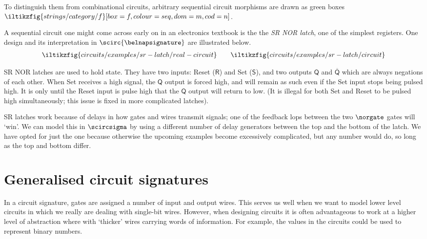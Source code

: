 To distinguish them from combinational circuits, arbitrary sequential circuit
morphisms are drawn as green boxes \(
\iltikzfig{strings/category/f}[box=f,colour=seq,dom=m,cod=n]
\).

\begin{example}[SR latch]\label{ex:sr-latch}
    A sequential circuit one might come across early on in an electronics
    textbook is the the \emph{SR NOR latch}, one of the simplest registers.
    One design and its interpretation in \(\scirc{\belnapsignature}\) are
    illustrated below.
    \begin{gather*}
        \iltikzfig{circuits/examples/sr-latch/real-circuit}
        \qquad
        \iltikzfig{circuits/examples/sr-latch/circuit}
    \end{gather*}

    SR NOR latches are used to hold state.
    They have two inputs: Reset (\(\mathsf{R}\)) and Set (\(\mathsf{S}\)), and
    two outputs \(\mathsf{Q}\) and \(\overline{\mathsf{Q}}\) which are always
    negations of each other.
    When Set receives a high signal, the \(\mathsf{Q}\) output is forced high,
    and will remain as such even if the Set input stops being pulsed high.
    It is only until the Reset input is pulse high that the \(\mathsf{Q}\)
    output will return to low.
    (It is illegal for both Set and Reset to be pulsed high simultaneously; this
    issue is fixed in more complicated latches).

    SR latches work because of delays in how gates and wires transmit signals;
    one of the feedback lops between the two \(\norgate\) gates will `win'.
    We can model this in \(\scircsigma\) by using a different number of delay
    generators between the top and the bottom of the latch.
    We have opted for just the one because otherwise the upcoming examples
    become excessively complicated, but any number would do, so long as the top
    and bottom differ.
\end{example}

\section{Generalised circuit signatures}

In a circuit signature, gates are assigned a number of input and output wires.
This serves us well when we want to model lower level circuits in which we
really are dealing with single-bit wires.
However, when designing circuits it is often advantageous to work at a higher
level of abstraction where with `thicker' wires carrying words of information.
For example, the values in the circuits could be used to represent binary
numbers.

